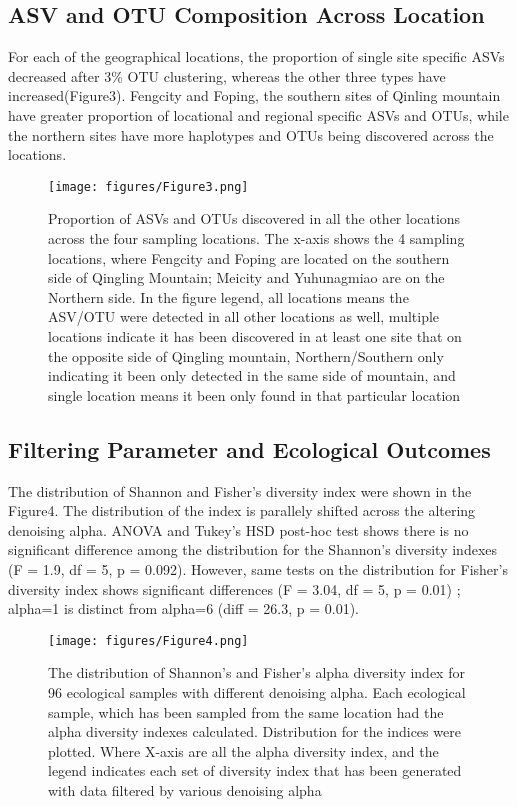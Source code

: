 \documentclass[11pt, a4paper]{article}
\begin{document}
\subsection{ASV and OTU Composition Across Location}
For each of the geographical locations, the proportion of single site specific ASVs decreased after 3\% OTU clustering, whereas the other three types have increased(Figure3). Fengcity and Foping, the southern sites of Qinling mountain have greater proportion of locational and regional specific ASVs and OTUs, while the northern sites have more haplotypes and OTUs being discovered across the locations.
\begin{figure}
    \centering
    \texttt{[image: figures/Figure3.png]}
    \caption{Proportion of ASVs and OTUs discovered in all the other locations across the four sampling locations. The x-axis shows the 4 sampling locations, where Fengcity and Foping are located on the southern side of Qingling Mountain;  Meicity and Yuhunagmiao are on the Northern side. In the figure legend, all locations means the ASV/OTU were detected in all other locations as well, multiple locations indicate it has been discovered in at least one site that on the opposite side of Qingling mountain, Northern/Southern only indicating it been only detected in the same side of mountain, and single location means it been only found in that particular location}
    \label{fig3}
\end{figure}

\subsection{Filtering Parameter and Ecological Outcomes}
The distribution of Shannon and Fisher’s diversity index were shown in the Figure4. The distribution of the index is parallely shifted across the altering denoising alpha. ANOVA and Tukey’s HSD post-hoc test shows there is no significant difference among the distribution for the Shannon’s diversity indexes (F = 1.9, df = 5, p = 0.092). However, same tests on the distribution for Fisher’s diversity index shows significant differences (F = 3.04, df = 5, p = 0.01) ; alpha=1 is distinct from alpha=6 (diff = 26.3, p = 0.01).

\begin{figure}
    \centering
    \texttt{[image: figures/Figure4.png]}
    \caption{The distribution of Shannon’s and Fisher’s alpha diversity index for 96 ecological samples with different denoising alpha. Each ecological sample, which has been sampled from the same location had the alpha diversity indexes calculated. Distribution for the indices were plotted. Where X-axis are all the alpha diversity index, and the legend indicates each set of diversity index that has been generated with data filtered by various denoising alpha}
    \label{fig4}
\end{figure}
\end{document}
